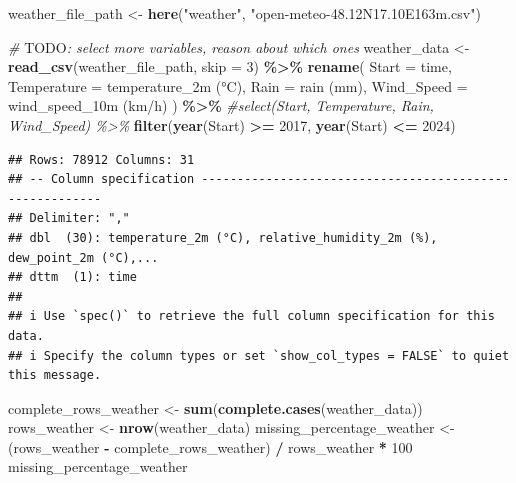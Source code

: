 \documentclass[
]{article}
\newenvironment{Shaded}{\begin{snugshade}}{\end{snugshade}}
\newcommand{\AlertTok}[1]{\textcolor[rgb]{0.94,0.16,0.16}{#1}}
\newcommand{\AttributeTok}[1]{\textcolor[rgb]{0.13,0.29,0.53}{#1}}
\newcommand{\CommentTok}[1]{\textcolor[rgb]{0.56,0.35,0.01}{\textit{#1}}}
\newcommand{\DecValTok}[1]{\textcolor[rgb]{0.00,0.00,0.81}{#1}}
\newcommand{\FunctionTok}[1]{\textcolor[rgb]{0.13,0.29,0.53}{\textbf{#1}}}
\newcommand{\NormalTok}[1]{#1}
\newcommand{\OtherTok}[1]{\textcolor[rgb]{0.56,0.35,0.01}{#1}}
\newcommand{\SpecialCharTok}[1]{\textcolor[rgb]{0.81,0.36,0.00}{\textbf{#1}}}
\newcommand{\StringTok}[1]{\textcolor[rgb]{0.31,0.60,0.02}{#1}}
\begin{document}
\begin{Shaded}
\begin{Highlighting}[]
\NormalTok{weather\_file\_path }\OtherTok{\textless{}{-}} \FunctionTok{here}\NormalTok{(}\StringTok{"weather"}\NormalTok{, }\StringTok{"open{-}meteo{-}48.12N17.10E163m.csv"}\NormalTok{)}

\CommentTok{\# }\AlertTok{TODO}\CommentTok{: select more variables, reason about which ones}
\NormalTok{weather\_data }\OtherTok{\textless{}{-}} \FunctionTok{read\_csv}\NormalTok{(weather\_file\_path, }\AttributeTok{skip =} \DecValTok{3}\NormalTok{) }\SpecialCharTok{\%\textgreater{}\%}
  \FunctionTok{rename}\NormalTok{(}
    \AttributeTok{Start =}\NormalTok{ time,}
    \AttributeTok{Temperature =} \StringTok{\textasciigrave{}}\AttributeTok{temperature\_2m (°C)}\StringTok{\textasciigrave{}}\NormalTok{,}
    \AttributeTok{Rain =} \StringTok{\textasciigrave{}}\AttributeTok{rain (mm)}\StringTok{\textasciigrave{}}\NormalTok{,}
    \AttributeTok{Wind\_Speed =} \StringTok{\textasciigrave{}}\AttributeTok{wind\_speed\_10m (km/h)}\StringTok{\textasciigrave{}}
\NormalTok{  ) }\SpecialCharTok{\%\textgreater{}\%}
  \CommentTok{\#select(Start, Temperature, Rain, Wind\_Speed) \%\textgreater{}\%}
  \FunctionTok{filter}\NormalTok{(}\FunctionTok{year}\NormalTok{(Start) }\SpecialCharTok{\textgreater{}=} \DecValTok{2017}\NormalTok{, }\FunctionTok{year}\NormalTok{(Start) }\SpecialCharTok{\textless{}=} \DecValTok{2024}\NormalTok{)}
\end{Highlighting}
\end{Shaded}

\begin{verbatim}
## Rows: 78912 Columns: 31
## -- Column specification --------------------------------------------------------
## Delimiter: ","
## dbl  (30): temperature_2m (°C), relative_humidity_2m (%), dew_point_2m (°C),...
## dttm  (1): time
## 
## i Use `spec()` to retrieve the full column specification for this data.
## i Specify the column types or set `show_col_types = FALSE` to quiet this message.
\end{verbatim}

\begin{Shaded}
\begin{Highlighting}[]
\NormalTok{complete\_rows\_weather }\OtherTok{\textless{}{-}} \FunctionTok{sum}\NormalTok{(}\FunctionTok{complete.cases}\NormalTok{(weather\_data))}
\NormalTok{rows\_weather }\OtherTok{\textless{}{-}} \FunctionTok{nrow}\NormalTok{(weather\_data)}
\NormalTok{missing\_percentage\_weather }\OtherTok{\textless{}{-}}\NormalTok{ (rows\_weather }\SpecialCharTok{{-}}\NormalTok{ complete\_rows\_weather) }\SpecialCharTok{/}\NormalTok{ rows\_weather }\SpecialCharTok{*} \DecValTok{100}
\NormalTok{missing\_percentage\_weather}
\end{Highlighting}
\end{Shaded}
\end{document}
